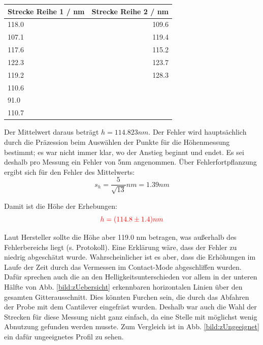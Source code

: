 \begin{center}
    \centering
    \begin{tabular}{l|r}
        Strecke Reihe 1 /  nm & Strecke Reihe 2 / nm \\
        \hline
        118.0 & 109.6 \\
        107.1 & 119.4 \\
        117.6 & 115.2 \\
        122.3 & 123.7 \\
        119.2 & 128.3 \\
        110.6 & \\
        91.0 & \\
        110.7 & \\
        
    \end{tabular}
\end{center}

Der Mittelwert daraus beträgt $h = 114.823 nm$.
Der Fehler wird hauptsächlich durch die Präzession beim Auswählen der Punkte für die Höhenmessung bestimmt; es war nicht immer klar, 
wo der Anstieg beginnt und endet. Es sei deshalb pro Messung ein Fehler von 5nm angenommen. Über Fehlerfortpflanzung ergibt sich für 
den Fehler des Mittelwerts: 
\begin{equation*}
    s_h = \frac{5}{\sqrt{13}} nm = 1.39 nm
\end{equation*}

Damit ist die Höhe der Erhebungen: 
\begin{equation*}
    \textcolor{red}{h = (114.8 \pm 1.4)nm}
\end{equation*}

Laut Hersteller sollte die Höhe aber 119.0 nm betragen, was außerhalb des Fehlerbereichs liegt (s. Protokoll). Eine Erklärung wäre, dass der Fehler 
zu niedrig abgeschätzt wurde. Wahrscheinlicher ist es aber, dass die Erhöhungen im Laufe der Zeit durch das Vermessen im Contact-Mode 
abgeschliffen wurden. Dafür sprechen auch die an den Helligkeitsunterschieden vor allem in der unteren Hälfte von 
Abb. \ref{bild:zUebersicht} erkennbaren horizontalen Linien über den gesamten Gitterausschnitt. Dies könnten Furchen sein, die durch das 
Abfahren der Probe mit dem Cantilever eingefräst wurden. Deshalb war auch die Wahl der Strecken für diese Messung nicht ganz einfach, da 
eine Stelle mit möglichst wenig Abnutzung gefunden werden musste. Zum Vergleich ist in Abb. \ref{bild:zUngeeignet} ein dafür 
ungeeignetes Profil zu sehen.

